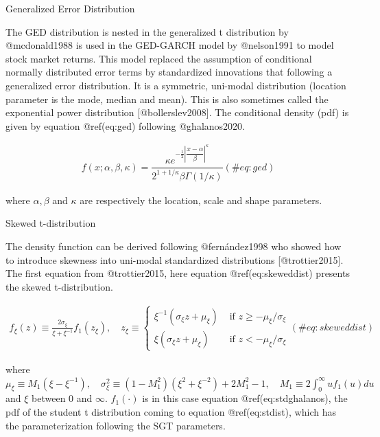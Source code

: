 \documentclass[
]{article}
\begin{document}
Generalized Error Distribution

\noindent The GED distribution is nested in the generalized t
distribution by @mcdonald1988 is used in the GED-GARCH model by
@nelson1991 to model stock market returns. This model replaced the
assumption of conditional normally distributed error terms by
standardized innovations that following a generalized error
distribution. It is a symmetric, uni-modal distribution (location
parameter is the mode, median and mean). This is also sometimes called
the exponential power distribution {[}@bollerslev2008{]}. The
conditional density (pdf) is given by equation @ref(eq:ged) following
@ghalanos2020.

\begin{align}
f(x; \alpha, \beta, \kappa) = \dfrac{\kappa e^{-\frac{1}{2}\left|\dfrac{x-\alpha}{\beta}\right|^\kappa}}{2^{1+1/\kappa}\beta\Gamma(1/\kappa)}
 (\#eq:ged)
\end{align}

where \(\alpha, \beta\) and \(\kappa\) are respectively the location,
scale and shape parameters.

Skewed t-distribution

\noindent The density function can be derived following @fernández1998
who showed how to introduce skewness into uni-modal standardized
distributions {[}@trottier2015{]}. The first equation from
@trottier2015, here equation @ref(eq:skeweddist) presents the skewed
t-distribution.

\begin{align}
f_{\xi}(z) \equiv \frac{2 \sigma_{\xi}}{\xi+\xi^{-1}} f_{1}\left(z_{\xi}\right), \quad z_{\xi} \equiv\left\{\begin{array}{ll}
\xi^{-1}\left(\sigma_{\xi} z+\mu_{\xi}\right) & \text { if } z \geq-\mu_{\xi} / \sigma_{\xi} \\
\xi\left(\sigma_{\xi} z+\mu_{\xi}\right) & \text { if } z<-\mu_{\xi} / \sigma_{\xi}
\end{array}\right.
 (\#eq:skeweddist)
\end{align}

\noindent where
\(\mu_{\xi} \equiv M_{1}\left(\xi-\xi^{-1}\right), \quad \sigma_{\xi}^{2} \equiv\left(1-M_{1}^{2}\right)\left(\xi^{2}+\xi^{-2}\right)+2 M_{1}^{2}-1, \quad M_{1} \equiv 2 \int_{0}^{\infty} u f_{1}(u) d u\)
and \(\xi\) between \(0\) and \(\infty\). \(f_1(\cdot)\) is in this case
equation @ref(eq:stdghalanos), the pdf of the student t distribution
coming to equation @ref(eq:stdist), which has the parameterization
following the SGT parameters.
\end{document}
